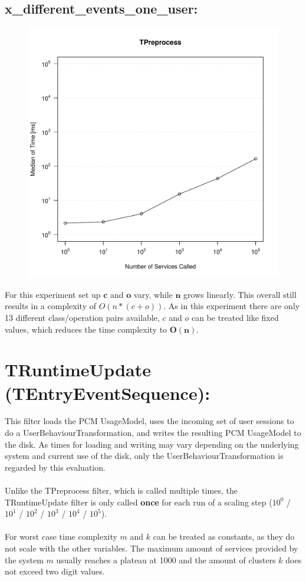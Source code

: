 \documentclass[10pt,a4paper]{article}
\begin{document}
	\subsection{x\_different\_events\_one\_user:}
	\begin{figure}[H]
		\centering
		\includegraphics[scale=0.7]{graphics/TPreprocess_median_different_events_ms.pdf}
	\end{figure}
	For this experiment set up $\mathbf{c}$ and $\mathbf{o}$ vary, while $\mathbf{n}$ grows linearly. This overall still results in a complexity of $O(n * (c + o))$. As in this experiment there are only 13 different class/operation pairs available, $c$ and $o$ can be treated like fixed values, which reduces the time complexity to $\mathbf{O(n)}$.
	\newpage
	\section{TRuntimeUpdate (TEntryEventSequence):}
	This filter loads the PCM UsageModel, uses the incoming set of user sessions to do a UserBehaviourTransformation, and writes the resulting PCM UsageModel to the disk. As times for loading and writing may vary depending on the underlying system and current use of the disk, only the UserBehaviourTransformation is regarded by this evaluation.\\
	\\
	Unlike the TPreprocess filter, which is called multiple times, the TRuntimeUpdate filter is only called \textbf{once} for each run of a scaling step ($10^0$ / $10^1$ / $10^2$ / $10^3$ / $10^4$ / $10^5$).\\
	\\
	For worst case time complexity $m$ and $k$ can be treated as constants, as they do not scale with the other variables. The maximum amount of services provided by the system $m$ usually reaches a plateau at 1000 and the amount of clusters $k$ does not exceed two digit values.
\end{document}

